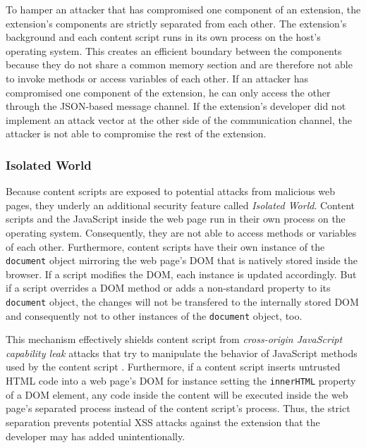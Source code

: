 	To hamper an attacker that has compromised one component of an extension, the extension's components are strictly separated from each other. The extension's background and each content script runs in its own process on the host's operating system. This creates an efficient boundary between the components because they do not share a common memory section and are therefore not able to invoke methods or access variables of each other. If an attacker has compromised one component of the extension, he can only access the other through the JSON-based message channel. If the extension's developer did not implement an attack vector at the other side of the communication channel, the attacker is not able to compromise the rest of the extension. 
	
\subsubsection{Isolated World}
	
	Because content scripts are exposed to potential attacks from malicious web pages, they underly an additional security feature called \textit{Isolated World}. Content scripts and the JavaScript inside the web page run in their own process on the operating system. Consequently, they are not able to access methods or variables of each other. Furthermore, content scripts have their own instance of the \texttt{document} object mirroring the web page's DOM that is natively stored inside the browser. If a script modifies the DOM, each instance is updated accordingly. But if a script overrides a DOM method or adds a non-standard property to its \texttt{document} object, the changes will not be transfered to the internally stored DOM and consequently not to other instances of the \texttt{document} object, too.	
	
	This mechanism effectively shields content script from \textit{cross-origin JavaScript capability leak} attacks that try to manipulate the behavior of JavaScript methods used by the content script \cite{Carlini:2012:EGC:2362793.2362800, Barth:2009:CJC:1855768.1855780}. Furthermore, if a content script inserts untrusted HTML code into a web page's DOM for instance setting the \texttt{innerHTML} property of a DOM element, any code inside the content will be executed inside the web page's separated process instead of the content script's process. Thus, the strict separation prevents potential XSS attacks against the extension that the developer may has added unintentionally.


